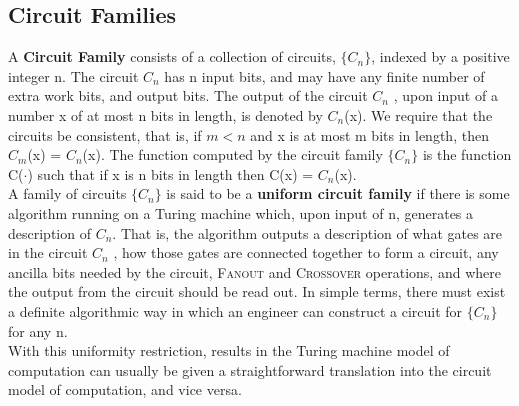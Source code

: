 \subsection{Circuit Families}
A {\bf Circuit Family} consists of a collection of circuits, {$ \{C_n \} $}, indexed by a positive integer n. The circuit {$C_n$} has n input bits, and may have any finite number of extra work bits, and output bits. The output of the circuit {$C_n$} , upon input of a number x of at most n bits in length, is denoted by {$C_n$}(x). We require that the circuits be consistent, that is, if {$m < n$} and x is at most m bits in length, then {$C_m$}(x) = {$C_n$}(x). The function computed by the circuit family {$ \{C_n\}$} is the function C({$\cdotp$}) such that if x is n bits in length then C(x) = {$C_n$}(x).
\\A family of circuits {$ \{C_n \} $} is said to be a {\bf uniform circuit family} if there is some algorithm running on a Turing machine which, upon input of n, generates a description of {$ C_n $}. That is, the algorithm outputs a description of what gates are in the circuit {$ C_n $} , how those gates are connected together to form a circuit, any ancilla bits needed by the circuit, {\scshape Fanout} and {\scshape Crossover} operations, and where the output from the circuit should be read out. In simple terms, there must exist a definite algorithmic way in which an engineer can construct a circuit for {$ \{C_n \} $} for any n.\\
With this uniformity restriction, results in the Turing machine model of computation can usually be given a straightforward translation into the circuit model of computation, and vice versa.
\newpage
